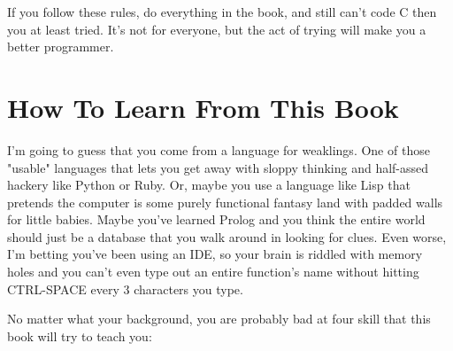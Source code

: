 If you follow these rules, do everything in the book, and still can't
code C then you at least tried.  It's not for everyone, but the act
of trying will make you a better programmer.

\section*{How To Learn From This Book}

I'm going to guess that you come from a language for weaklings.  One of those
"usable" languages that lets you get away with sloppy thinking and half-assed
hackery like Python or Ruby.  Or, maybe you use a language like Lisp that pretends the
computer is some purely functional fantasy land with padded walls for little babies.
Maybe you've learned Prolog and you think the entire world should just be a database
that you walk around in looking for clues.  Even worse, I'm betting you've been
using an IDE, so your brain is riddled with memory holes and you can't even
type out an entire function's name without hitting CTRL-SPACE every 3 characters
you type.

No matter what your background, you are probably bad at four skill that this
book will try to teach you:

